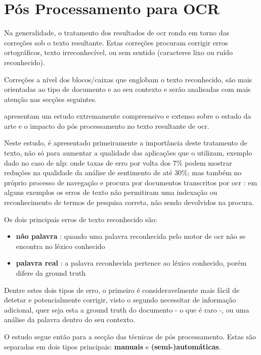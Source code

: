 \section{Pós Processamento para OCR}
\label{sec_pos_proc_ocr}

Na generalidade, o tratamento dos resultados de \acrshort{ocr} ronda em torno das correções sob o texto resultante. Estas correções procuram corrigir erros ortográficos, texto irreconhecível, ou sem sentido (caracteres lixo ou ruído reconhecido).

Correções a nível dos blocos/caixas que englobam o texto reconhecido, são mais orientadas ao tipo de documento e ao seu contexto e serão analisadas com mais atenção nas secções seguintes.

\cite{10.1145/3453476} apresentam um estudo extremamente compreensivo e extenso sobre o estado da arte e o impacto do pós processamento no texto resultante de \acrshort{ocr}.

Neste estudo, é apresentado primeiramente a importância deste tratamento de texto, não só para aumentar a qualidade das aplicações que o utilizam, exemplo dado no caso de \acrshort{nlp}: onde taxas de erro por volta dos 7\% podem mostrar reduções na qualidade da análise de sentimento de até 30\%; mas também no próprio processo de navegação e procura por documentos transcritos por \acrshort{ocr} : em alguns exemplos os erros de texto não permitiram uma indexação ou reconhecimento de termos de pesquisa correta, não sendo devolvidos na procura.

Os dois principais erros de texto reconhecido são:
\begin{itemize}
    \item \textbf{não palavra} : quando uma palavra reconhecida pelo motor de \acrshort{ocr} não se encontra no léxico conhecido
    \item \textbf{palavra real} : a palavra reconhecida pertence ao léxico conhecido, porém difere da \gls{ground truth}
\end{itemize}
Dentre estes dois tipos de erro, o primeiro é consideravelmente mais fácil de detetar e potencialmente corrigir, visto o segundo necessitar de informação adicional, quer seja esta a \gls{ground truth} do documento - o que é raro -, ou uma análise da palavra dentro do seu contexto.

O estudo segue então para a secção das técnicas de pós processamento. Estas são separadas em dois tipos principais: \textbf{manuais} e \textbf{(semi-)automáticas}.

